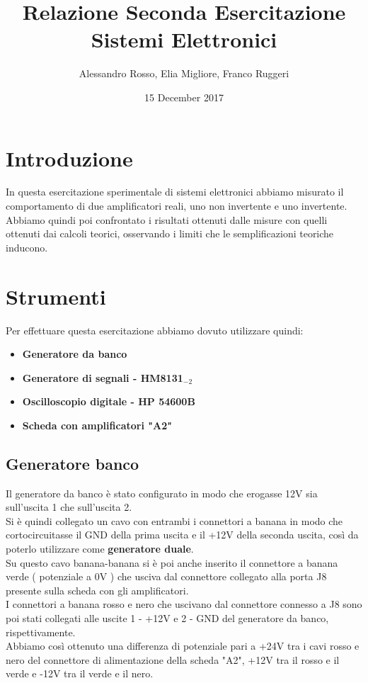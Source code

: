 \documentclass{article}
\author{Alessandro Rosso, Elia Migliore, Franco Ruggeri}
\title{Relazione Seconda Esercitazione Sistemi Elettronici}
\date{15 December 2017}
\begin{document}
\maketitle

\section{Introduzione}
In questa esercitazione sperimentale di sistemi elettronici abbiamo misurato il comportamento di due amplificatori reali, uno non invertente e uno invertente.\\Abbiamo quindi poi confrontato i risultati ottenuti dalle misure con quelli ottenuti dai calcoli teorici, osservando i limiti che le semplificazioni teoriche inducono.

\section{Strumenti}
Per effettuare questa esercitazione abbiamo dovuto utilizzare quindi:
\begin{itemize}
	\item \textbf{Generatore da banco}
	\item \textbf{Generatore di segnali - HM8131$_{-2}$}
    \item \textbf{Oscilloscopio digitale - HP 54600B}
	\item \textbf{Scheda con amplificatori "A2"}
\end{itemize}

\subsection{Generatore banco}

Il generatore da banco è stato configurato in modo che erogasse 12V sia sull'uscita 1 che sull'uscita 2.
\\
Si è quindi collegato un cavo con entrambi i connettori a banana in modo che cortocircuitasse il GND della prima uscita e il +12V della seconda uscita, così da poterlo utilizzare come \textbf{generatore duale}.\\ Su questo cavo banana-banana si è poi anche inserito il connettore a banana verde ( potenziale a 0V ) che usciva dal connettore collegato alla porta J8 presente sulla scheda con gli amplificatori.\\
I connettori a banana rosso e nero che uscivano dal connettore connesso a J8 sono poi stati collegati alle uscite 1 - +12V e 2 - GND del generatore da banco, rispettivamente.\\
Abbiamo così ottenuto una differenza di potenziale pari a +24V tra i cavi rosso e nero del connettore di alimentazione della scheda "A2", +12V tra il rosso e il verde e -12V tra il verde e il nero.
\end{document}
